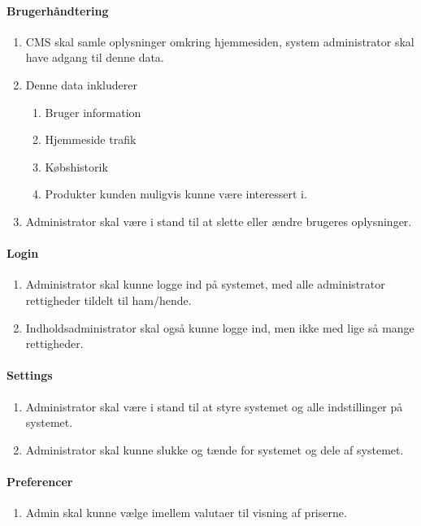 \paragraph{Brugerhåndtering}
	\begin{enumerate}
	\item CMS skal samle oplysninger omkring hjemmesiden, system administrator skal have adgang til denne data.
    \item Denne data inkluderer
    \begin{enumerate}
    \item Bruger information
    \item Hjemmeside trafik
    \item Købshistorik
    \item Produkter kunden muligvis kunne være interessert i.
    \end{enumerate}
    \item Administrator skal være i stand til at slette eller ændre brugeres oplysninger.
	\end{enumerate}

\paragraph{Login}
	\begin{enumerate}
	\item Administrator skal kunne logge ind på systemet, med alle administrator rettigheder tildelt til ham/hende.
    \item Indholdsadministrator skal også kunne logge ind, men ikke med lige så mange rettigheder.
	\end{enumerate}
    
\paragraph{Settings}
	\begin{enumerate}
	\item Administrator skal være i stand til at styre systemet og alle indstillinger på systemet.
    \item Administrator skal kunne slukke og tænde for systemet og dele af systemet.
	\end{enumerate}

\paragraph{Preferencer}
	\begin{enumerate}
	\item Admin skal kunne vælge imellem valutaer til visning af priserne.
	\end{enumerate}
    
